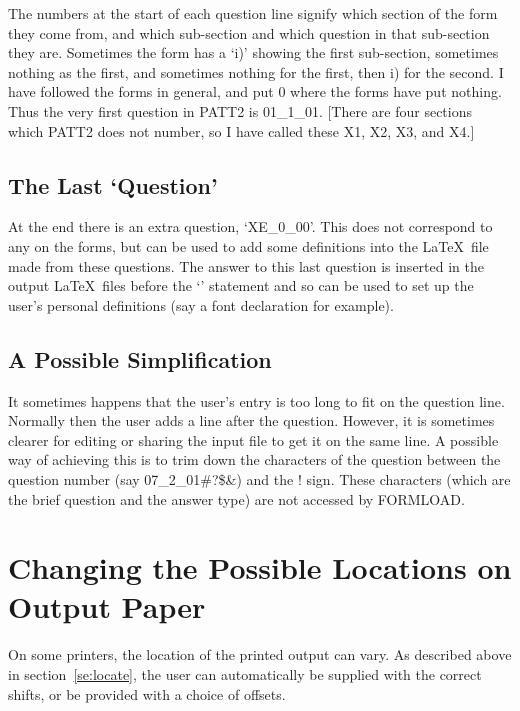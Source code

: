The numbers at the start of each question line signify which section of the
form they come from, and which sub-section and which question in that
sub-section they are. Sometimes the form has a `i)' showing the first
sub-section, sometimes nothing as the first, and sometimes nothing for the
first, then i) for the second. I have followed the forms in general, and
put 0 where the forms have put nothing. Thus the very first question in
PATT2 is 01\_1\_01. [There are four sections which PATT2 does not number,
so I have called these X1, X2, X3, and X4.] 

\subsection{The Last `Question'}

At the end there is an extra question, `XE\_0\_00'. This does not
correspond to any on the forms, but can be used to add some definitions
into the \LaTeX\ file made from these questions. The answer to this last
question is inserted in the output \LaTeX\ files before the
`\verb++' statement and so can be used to set up the user's
personal definitions (say a font declaration for example). 

\subsection{A Possible Simplification}

It sometimes happens that the user's entry is too long to fit on the
question line. Normally then the user adds a line after the question.
However, it is sometimes clearer for editing or sharing the input file to
get it on the same line. A possible way of achieving this is to trim down
the characters of the question between the question number (say
07\_2\_01\#?\$\&) and the ! sign. These characters (which are the brief
question and the answer type) are not accessed by FORMLOAD. 



\section{Changing the Possible Locations on Output Paper}
\label{se:offset}

On some printers, the location of the printed output can vary. As described
above in section~\ref{se:locate}, the user can automatically be supplied
with the correct shifts, or be provided with a choice of offsets. 


